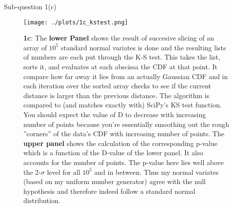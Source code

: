 \begin{subsection}{Sub-question 1(c)}
\begin{figure}[h!]
  \centering
  \texttt{[image: ./plots/1c\_kstest.png]}
  \caption{\textbf{1c}: The \textbf{lower Panel} shows the result of succesive slicing of an array of $10^5$ standard normal variates is done and the resulting lists of numbers are each put through the K-S test. This takes the list, sorts it, and evaluates at each abscissa the CDF at that point. It compare how far away it lies from an actually Gaussian CDF and in each iteration over the sorted array checks to see if the current distance is larger than the previous distance. The algorithm is compared to (and matches exactly with) SciPy's KS test function. You should expect the value of D to decrease with increasing number of points because you're essentially smoothing out the rough ''corners'' of the data's CDF with increasing number of points. The \textbf{upper panel} shows the calculation of the corresponding p-value which is a function of the D-value of the lower panel. It also accounts for the number of points. The p-value here lies well above the 2-$\sigma$ level for all $10^5$ and in between. Thus my normal variates (based on my uniform number generator) agree with the null hypothesis and therefore indeed follow a standard normal distribution.}
  \label{fig:kstest}
\end{figure}


\end{subsection}

\FloatBarrier

